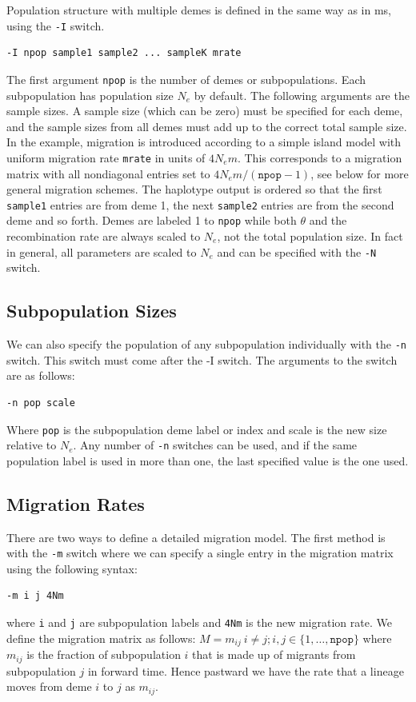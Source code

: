 \documentclass{article}
\begin{document}
Population structure with multiple demes is defined in the same way as in ms,
using the {\tt -I} switch.
\begin{verbatim}
-I npop sample1 sample2 ... sampleK mrate 
\end{verbatim}
The first argument {\tt npop} is the number of demes or subpopulations. Each
subpopulation has population size $N_e$ by default. The following arguments are
the sample sizes. A sample size (which can be zero) must be specified for each
deme, and the sample sizes from all demes must add up to the correct total sample
size. In the example, migration is introduced according to a simple island model
with uniform migration rate {\tt mrate} in units of $4N_em$. This corresponds to
a migration matrix with all nondiagonal entries set to $4N_em/(\texttt{npop}-1)$,
see below for more general migration schemes. The haplotype output is ordered so
that the first {\tt sample1} entries are from deme 1, the next {\tt sample2}
entries are from the second deme and so forth. Demes are labeled 1 to {\tt npop}
while both $\theta$ and the recombination rate are  always scaled to $N_e$, not
the total population size. In fact in general, all parameters are scaled to $N_e$
and can be specified with the {\tt -N} switch.

\subsection{Subpopulation Sizes}

We can also specify the population of any subpopulation individually with the
{\tt -n} switch. This switch must come after the -I switch. The arguments to
the switch are as follows:
\begin{verbatim}
-n pop scale
\end{verbatim}
Where {\tt pop} is the subpopulation deme label or index and scale is the new
size relative to $N_e$. Any number of {\tt -n} switches can be used, and if the
same population label is used in more than one, the last specified value is the
one used. 

\subsection{Migration Rates}
There are two ways to define a detailed migration model. The first method is with
the {\tt -m} switch where we can specify a single entry in the migration matrix
using the following syntax:
\begin{verbatim}
-m i j 4Nm
\end{verbatim}
where {\tt i} and {\tt j} are subpopulation labels and {\tt 4Nm} is the new
migration rate. We define  the migration matrix as follows: $M=m_{ij}\ i\neq
j;i,j \in \{1,\ldots,\texttt{npop}\}$ where $m_{ij}$ is the fraction of
subpopulation $i$ that is made up of migrants from subpopulation $j$ in forward
time. Hence pastward we have the rate that a lineage moves from deme $i$ to $j$
as $m_{ij}$. 
\end{document}
